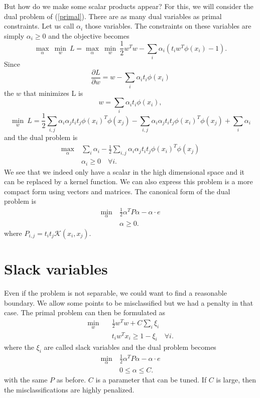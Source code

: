 \documentclass{article}
\begin{document}
But how do we make some scalar products appear? For this, we will consider the dual problem of (\ref{primal}). There are as many dual variables as primal constraints. Let us call $\alpha_i$ those variables. The constraints on these variables are simply $\alpha_i \geq 0$ and the objective becomes
$$\max_{\alpha} \ \min_{w} \ L = \max_{\alpha} \ \min_{w} \ \frac{1}{2} w^Tw - \sum_i \alpha_i (t_iw^T\phi(x_i)-1).$$ 
Since
$$\frac{\partial L}{\partial w} = w - \sum_i \alpha_i t_i \phi(x_i)$$
the $w$ that minimizes L is
$$w = \sum_i \alpha_i t_i \phi(x_i),$$
$$ \min_{w} \ L = \frac{1}{2} \sum_{i,j} \alpha_i \alpha_j t_i t_j \phi(x_i)^T \phi(x_j) - \sum_{i,j} \alpha_i \alpha_j t_i t_j \phi(x_i)^T \phi(x_j) + \sum_i \alpha_i$$
and the dual problem is
 \begin{align*}
\max_{\alpha} \ &\sum_i \alpha_i -  \frac{1}{2} \sum_{i,j} \alpha_i \alpha_j t_i t_j \phi(x_i)^T \phi(x_j)\\
&\alpha_i \geq 0 \quad \forall i  \nonumber.
\end{align*}
We see that we indeed only have a scalar in the high dimensional space and it can be replaced by a kernel function. We can also express this problem is a more compact form using vectors and matrices. The canonical form of the dual problem is 
 \begin{align}
\min_{\alpha} \ & \frac{1}{2} \alpha^T P \alpha - \alpha \cdot e\\
&\alpha \geq 0  \nonumber.
\label{dual}
\end{align}
where $P_{i,j} = t_it_j\mathcal{K}(x_i, x_j)$.

\section{Slack variables}
Even if the problem is not separable, we could want to find a reasonable boundary. We allow some points to be misclassified but we had a penalty in that case.
The primal problem can then be formulated as
\begin{align}
\min_{w}\quad &\frac{1}{2} w^Tw + C \sum_i \xi_i \\
&t_iw^Tx_i \geq 1- \xi_i \quad \forall i  \nonumber.
\label{primalslack}
\end{align}
where the $\xi_i$ are called slack variables and the dual problem becomes
 \begin{align}
\min_{\alpha} \ & \frac{1}{2} \alpha^T P \alpha - \alpha \cdot e\\
&0 \leq \alpha \leq C  \nonumber.
\label{dualslack}
\end{align}
with the same $P$ as before. $C$ is a parameter that can be tuned. If $C$ is large, then the misclassifications are highly penalized.
\end{document}

